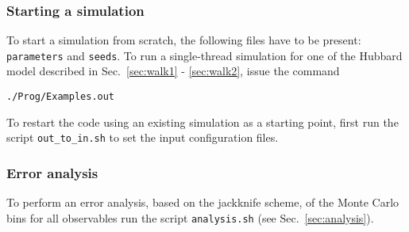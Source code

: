 \subsubsection{Starting a simulation}

To start a simulation from scratch, the following files have to be present: \texttt{parameters} and \texttt{seeds}. 
To run a single-thread simulation for one of the  Hubbard model described in Sec.~\ref{sec:walk1} - \ref{sec:walk2}, issue the command
\begin{verbatim}
./Prog/Examples.out
\end{verbatim}
To restart the code using an existing simulation as a starting point, first run the script \texttt{out\_to\_in.sh} to set 
the input configuration files.

\subsubsection{Error analysis}

To perform an error analysis, based on the jackknife scheme, of the Monte Carlo bins for all observables run the script \texttt{analysis.sh} 
(see Sec.~\ref{sec:analysis}).

 



